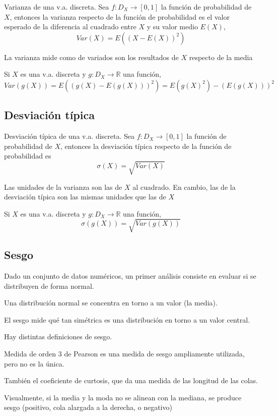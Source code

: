 \documentclass[
]{article}
\begin{document}
Varianza de una v.a. discreta. Sea \(f:D_X\longrightarrow[0,1]\) la
función de probabilidad de \(X\), entonces la varianza respecto de la
función de probabilidad es el valor esperado de la diferencia al
cuadrado entre \(X\) y su valor medio \(E(X)\),
\[Var(X)= E((X-E(X))^2) \]

La varianza mide como de variados son los resultados de \(X\) respecto
de la media

Si \(X\) es una v.a. discreta y \(g:D_X\longrightarrow \mathbb{R}\) una
función, \[Var(g(X))=E((g(X)-E(g(X)))^2)=E(g(X)^2)-(E(g(X)))^2\]

\hypertarget{desviaciuxf3n-tuxedpica}{%
\subsection{Desviación típica}\label{desviaciuxf3n-tuxedpica}}

Desviación típica de una v.a. discreta. Sea
\(f:D_X\longrightarrow[0,1]\) la función de probabilidad de \(X\),
entonces la desviación típica respecto de la función de probabilidad es
\[\sigma(X)=\sqrt{Var(X)}\]

Las unidades de la varianza son las de \(X\) al cuadrado. En cambio, las
de la desviación típica son las mismas unidades que las de \(X\)

Si \(X\) es una v.a. discreta y \(g:D_X\longrightarrow \mathbb{R}\) una
función, \[\sigma(g(X))=\sqrt{Var(g(X))}\]

\hypertarget{sesgo}{%
\subsection{Sesgo}\label{sesgo}}

Dado un conjunto de datos numéricos, un primer análisis consiste en
evaluar si se distribuyen de forma normal.

Una distribución normal se concentra en torno a un valor (la media).

El sesgo mide qué tan simétrica es una distribución en torno a un valor
central.

Hay distintas definiciones de sesgo.

Medida de orden 3 de Pearson es una medida de sesgo ampliamente
utilizada, pero no es la única.

También el coeficiente de curtosis, que da una medida de las longitud de
las colas.

Visualmente, si la media y la moda no se alinean con la mediana, se
produce sesgo (positivo, cola alargada a la derecha, o negativo)
\end{document}
